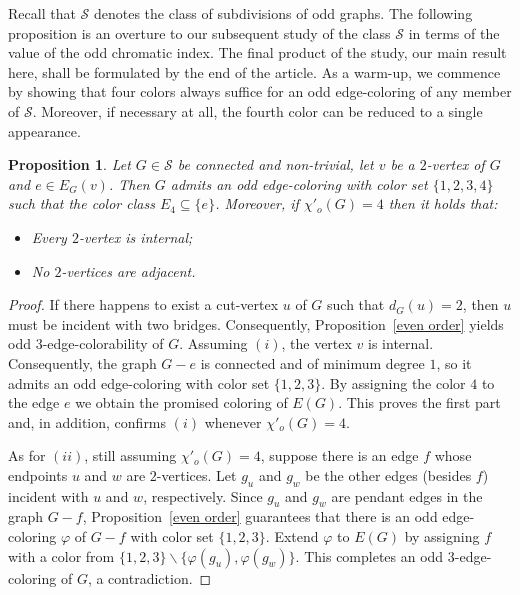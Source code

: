 \documentclass[a4paper,12pt]{article}
\newtheorem{proposition}[theorem]{Proposition}
\numberwithin{equation}{section}
\begin{document}
Recall that $\mathcal{S}$ denotes the class of subdivisions of odd graphs. The following proposition is an overture to our subsequent study of the class $\mathcal{S}$ in terms of the value of the odd chromatic index. The final product of the study, our main result here, shall be formulated by the end of the article. As a warm-up, we commence by showing that four colors always suffice for an odd edge-coloring of any member of $\mathcal{S}$. Moreover, if necessary at all, the fourth color can be reduced to a single appearance.
\begin{proposition}
    \label{4-edge-colorability}
Let $G\in \mathcal{S}$ be connected and non-trivial, let $v$ be a $2$-vertex of $G$ and $e\in E_G(v)$. Then $G$ admits an odd edge-coloring with color set $\{1,2,3,4\}$ such that the color class $E_4\subseteq \{e\}$. Moreover, if $\chi'_o(G)=4$ then it holds that:
 \begin{itemize}
 \item [$(i)$] Every $2$-vertex is internal;
 \item [$(ii)$] No $2$-vertices are adjacent.
 \end{itemize}
\end{proposition}
\begin{proof}
If there happens to exist a cut-vertex $u$ of $G$ such that $d_G(u)=2$, then $u$ must be incident with two bridges. Consequently, Proposition~\ref{even order} yields odd $3$-edge-colorability of $G$. Assuming $(i)$, the vertex $v$ is internal. Consequently, the graph $G-e$ is connected and of minimum degree $1$, so it admits an odd edge-coloring with color set $\{1,2,3\}$. By assigning the color $4$ to the edge $e$ we obtain the promised coloring of $E(G)$. This proves the first part and, in addition, confirms $(i)$ whenever $\chi'_o(G)=4$.

As for $(ii)$, still assuming $\chi'_o(G)=4$, suppose there is an edge $f$ whose endpoints $u$ and $w$ are $2$-vertices. Let $g_u$ and $g_w$ be the other edges (besides $f$) incident with $u$ and $w$, respectively. Since $g_u$ and $g_w$ are pendant edges in the graph $G-f$, Proposition~\ref{even order} guarantees that there is an odd edge-coloring $\varphi$ of $G-f$ with color set $\{1,2,3\}$. Extend $\varphi$ to $E(G)$ by assigning $f$ with a color from $\{1,2,3\}\backslash\{\varphi(g_u),\varphi(g_w)\}$. This completes an odd $3$-edge-coloring of $G$, a contradiction.\end{proof}
\end{document}
